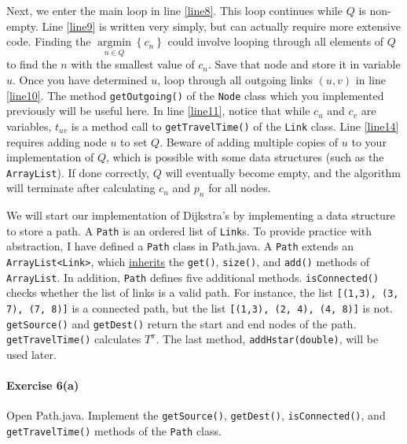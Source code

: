 \documentclass[12pt]{article}
\DeclareMathOperator*{\argmin}{\arg\min}
\begin{document}
Next, we enter the main loop in line \ref{line8}. This loop continues while $Q$ is non-empty. Line \ref{line9} is written very simply, but can actually require more extensive code. Finding the $\argmin\limits_{n\in Q} \left\{c_n\right\}$ could involve looping through all elements of $Q$ to find the $n$ with the smallest value of $c_n$. Save that node and store it in variable $u$. Once you have determined $u$, loop through all outgoing links $(u,v)$ in line \ref{line10}. The method \texttt{getOutgoing()} of the \texttt{Node} class which you implemented previously will be useful here. In line \ref{line11}, notice that while $c_u$ and $c_v$ are variables, $t_{uv}$ is a method call to \texttt{getTravelTime()} of the \texttt{Link} class. Line \ref{line14} requires adding node $u$ to set $Q$. Beware of adding multiple copies of $u$ to your implementation of $Q$, which is possible with some data structures (such as the \texttt{ArrayList}). If done correctly, $Q$ will eventually become empty, and the algorithm will terminate after calculating $c_n$ and $p_n$ for all nodes. 






We will start our implementation of Dijkstra's by implementing a data structure to store a path. 
A \texttt{Path} is an ordered list of \texttt{Link}s. To provide practice with abstraction, I have defined a \texttt{Path} class in Path.java. A \texttt{Path} extends an \texttt{ArrayList<Link>}, which \href{https://www.w3schools.com/java/java_inheritance.asp}{inherits} the \texttt{get()}, \texttt{size()}, and \texttt{add()} methods of \texttt{ArrayList}. In addition, \texttt{Path} defines five additional methods. \texttt{isConnected()} checks whether the list of links is a valid path. For instance, the list \texttt{[(1,3), (3, 7), (7, 8)]} is a connected path, but the list \texttt{[(1,3), (2, 4), (4, 8)]} is not. \texttt{getSource()} and \texttt{getDest()} return the start and end nodes of the path.
\texttt{getTravelTime()} calculates $T^\pi$. The last method, \texttt{addHstar(double)}, will be used later.


\paragraph*{Exercise 6(a)} Open Path.java. Implement the \texttt{getSource()}, \texttt{getDest()}, \texttt{isConnected()}, and \texttt{getTravelTime()}  methods of the \texttt{Path} class.


\vspace{\baselineskip}
\end{document}
